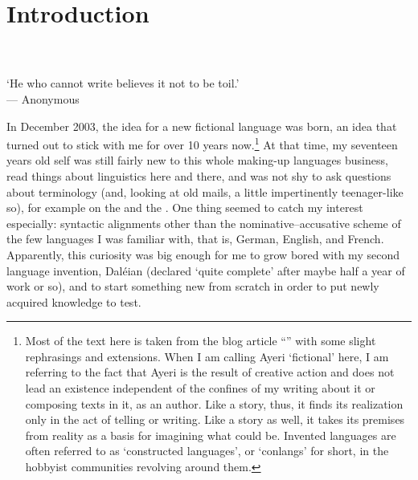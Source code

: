 \setcounter{chapter}{-1}
\chapter{Introduction}
\label{ch:introduction}

\begin{flushright}\smaller
{}\\
\\
`He who cannot write believes it not to be toil.'\\
--- Anonymous\footnotemark
\end{flushright}\bigskip


\noindent In December 2003, the idea for a new fictional language was born, an
idea that turned out to stick with me for over 10 years now.\footnote{Most of
the text here is taken from the blog article
``'' \parencite{benung:happybirthday} with some
slight rephrasings and extensions. When I am calling Ayeri `fictional' here, I
am referring to the fact that Ayeri is the result of creative action and does
not lead an existence independent of the confines of my writing about it or
composing texts in it, as an author. Like a story, thus, it finds its
realization only in the act of telling or writing. Like a story as well, it
takes its premises from reality as a basis for imagining what could be.
Invented languages are often referred to as `constructed languages', or
`conlangs' for short, in the hobbyist communities revolving around them.} At
that time, my seventeen years old self was still fairly new to this whole
making-up languages business, read things about linguistics here and there, and
was not shy to ask questions about terminology (and, looking at old mails, a
little impertinently teenager-like so), for example on the
 and the . One thing seemed to catch my
interest especially: syntactic alignments other than the nominative--accusative
scheme of the few languages I was familiar with, that is, German, English, and
French. Apparently, this curiosity was big enough for me to grow bored with my
second language invention, Daléian (declared `quite complete' after maybe half
a year of work or so), and to start something new from scratch in order to put
newly acquired knowledge to test.

